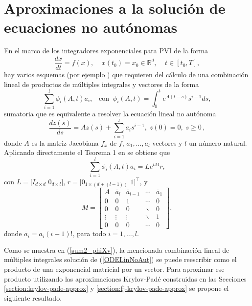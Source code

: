 \section{Aproximaciones a la solución de ecuaciones no autónomas}\label{section:approx-non-auto}
En el marco de los integradores exponenciales para PVI de la forma
\begin{equation*}
	\frac{dx}{dt}=f(x),  \;\;\;\; x(t_0)=x_0 \in \mathbb{R}^{d},   \;\;\;\; t\in[t_0,T],
\end{equation*}
hay varios esquemas (por ejemplo \cite{tokman2006efficient,delaCruz07,hochbruck2011exponential}) que requieren del cálculo de una combinación lineal de productos de múltiples integrales y vectores de la forma
\begin{equation*}
	\sum\limits_{i=1}^{l}\phi _{i}(A,t)a_{i},   \;\;\;\mathrm{con} \;\; \phi _{i}(A,t)=\int_{0}^{t}e^{A(t-s)}s^{i-1}ds,
\end{equation*}
sumatoria que es equivalente a resolver la ecuación lineal no autónoma \cite{delaCruz07,skaflestad2009scaling}
\begin{equation}\label{ODELinNoAut}
	\frac{dz(s)}{ds} = Az(s)+\sum\limits_{i=1}^{l}a_is^{i-1},\;z(0)=0,\;s\geq 0\, ,
\end{equation}
donde $A$ es la matriz Jacobiana $f_x$ de $f$, $a_1,\ldots,a_l$ vectores y $l$ un número natural. 
Aplicando directamente el Teorema 1 en \cite{carbonell2008computing} se obtiene que \cite{carbonell2008computing,jimenez2006local}
\begin{equation}\label{sum2_phiXv}
\sum\limits_{i=1}^{l}\phi _{i}(A,t)a_{i} = L e^{t M}r,
\end{equation}
con $L=[I_{d\times d}$ $0_{d\times l}]$, $r=[0_{1\times (d+(l-1))}$ $1]^{\intercal }$, y
\begin{equation*}
M=\left[
\begin{array}{ccccc}
A & \overline{a}_{l} & \overline{a}_{l-1} & \cdots & \overline{a}_{1} \\ 
0 & 0 & 1 & \cdots & 0 \\
0 & 0 & 0 & \ddots & 0 \\
\vdots & \vdots & \vdots & \ddots & 1 \\
0 & 0 & 0 & \cdots & 0
\end{array}%
\right],  \label{matrixH2}
\end{equation*}%
donde $\overline{a}_{i}=a_{i}(i-1)!$, para todo $i=1,\ldots ,l$.

Como se muestra en (\ref{sum2_phiXv}), la mencionada combinación lineal de múltiples integrales solución de (\ref{ODELinNoAut}) se puede reescribir como el producto de una exponencial matricial por un vector. Para aproximar ese producto utilizando las aproximaciones Krylov-Padé construidas en las Secciones \ref{section:krylov-pade-approx} y \ref{section:fj-krylov-pade-approx} se propone el siguiente resultado.

